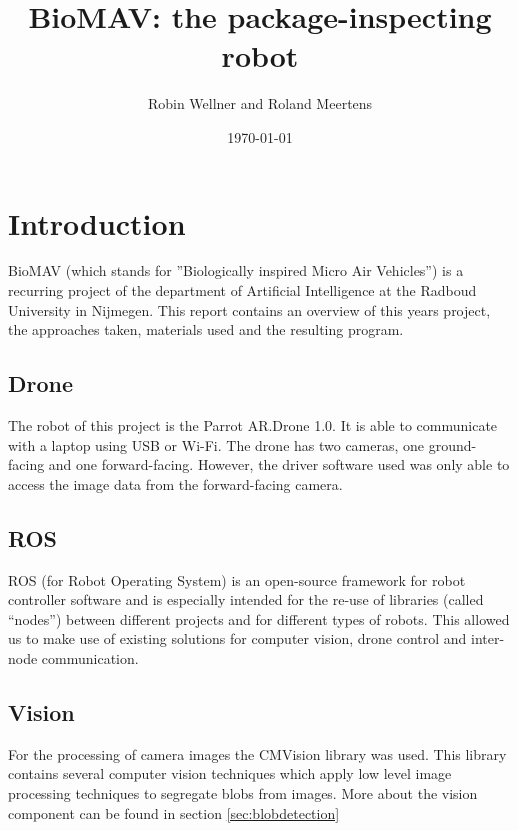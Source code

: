 \documentclass[a4paper,10pt]{article}
\begin{document}
\title{BioMAV: the package-inspecting robot}

\author{Robin Wellner and Roland Meertens}

\date{\today}

\maketitle

\section{Introduction}
BioMAV (which stands for ''Biologically inspired Micro Air Vehicles'') is a recurring project of the department of Artificial
Intelligence at the Radboud University in Nijmegen.
This report contains an overview of this years project, the approaches taken, materials used and the resulting program. 


\subsection{Drone}
The robot of this project is the Parrot AR.Drone 1.0. It is able to
communicate with a laptop using USB or Wi-Fi. The drone has two cameras, one
ground-facing and one forward-facing. However, the driver software used was only able to access the image data from the forward-facing camera.

\subsection{ROS}
ROS (for Robot Operating System) is an open-source framework for robot
controller software and is especially intended for the re-use of libraries
(called ``nodes'') between different projects and for different types of
robots. This allowed us to make use of existing solutions for computer vision, drone control and inter-node communication.

\subsection{Vision}
For the processing of camera images the CMVision library was used. 
This library contains several computer vision techniques which apply low level image processing techniques to segregate blobs from images. 
More about the vision component can be found in section \ref{sec:blobdetection}
\end{document}
